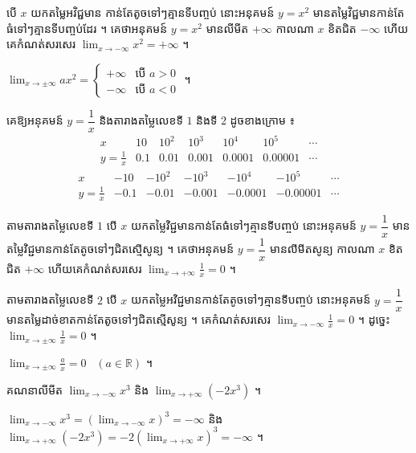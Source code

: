បើ $x$ យកតម្លៃអវិជ្ជមាន កាន់តែតូចទៅៗគ្មានទីបញ្ចប់ នោះអនុគមន៍ $y = x^2$ មានតម្លៃវិជ្ជមានកាន់តែធំទៅៗគ្មានទីបញ្ចប់ដែរ ។ គេថាអនុគមន៍ $y = x^2$ មានលីមីត $+\infty$ កាលណា $x$ ខិតជិត $-\infty$ ហើយគេកំណត់សរសេរ $\displaystyle\lim_{x \to -\infty} x^2 = +\infty$ ។

\begin{formulaBox}[ជាទូទៅ]
$\displaystyle\lim_{x \to \pm\infty} ax^2 = \begin{cases} +\infty & \text{បើ } a > 0\\ -\infty & \text{បើ } a < 0 \end{cases}$ ។
\end{formulaBox}

\begin{example}[ឧទាហរណ៍ ២]
គេឱ្យអនុគមន៍ $y = \dfrac{1}{x}$ និងតារាងតម្លៃលេខទី $1$ និងទី $2$ ដូចខាងក្រោម ៖
\[
\begin{array}{c|cccccc}
x & 10 & 10^2 & 10^3 & 10^4 & 10^5 & \cdots\\ \hline
y = \frac{1}{x} & 0.1 & 0.01 & 0.001 & 0.0001 & 0.00001 & \cdots
\end{array}
\]
\[
\begin{array}{c|cccccc}
x & -10 & -10^2 & -10^3 & -10^4 & -10^5 & \cdots\\ \hline
y = \frac{1}{x} & -0.1 & -0.01 & -0.001 & -0.0001 & -0.00001 & \cdots
\end{array}
\]
\end{example}
តាមតារាងតម្លៃលេខទី $1$ បើ $x$ យកតម្លៃវិជ្ជមានកាន់តែធំទៅៗគ្មានទីបញ្ចប់ នោះអនុគមន៍ $y = \dfrac{1}{x}$ មានតម្លៃវិជ្ជមានកាន់តែតូចទៅៗជិតស្មើសូន្យ ។ គេថាអនុគមន៍ $y = \dfrac{1}{x}$ មានលីមីតសូន្យ កាលណា $x$ ខិតជិត $+\infty$ ហើយគេកំណត់សរសេរ $\displaystyle\lim_{x \to +\infty}\frac{1}{x} = 0$ ។

តាមតារាងតម្លៃលេខទី $2$ បើ $x$ យកតម្លៃអវិជ្ជមានកាន់តែតូចទៅៗគ្មានទីបញ្ចប់ នោះអនុគមន៍ $y = \dfrac{1}{x}$ មានតម្លៃដាច់ខាតកាន់តែតូចទៅៗជិតស្មើសូន្យ ។ គេកំណត់សរសេរ $\displaystyle\lim_{x \to -\infty}\frac{1}{x} = 0$ ។ ដូច្នេះ $\displaystyle\lim_{x \to \pm\infty}\frac{1}{x} = 0$ ។

\begin{formulaBox}[ជាទូទៅ]
$\displaystyle\lim_{x \to \pm\infty}\frac{a}{x} = 0$ \ $(a \in \mathbb{R})$ ។
\end{formulaBox}

\begin{example}[លំហាត់គំរូ ១]
គណនាលីមីត $\displaystyle\lim_{x \to -\infty} x^3$ និង $\displaystyle\lim_{x \to +\infty}(-2x^3)$ ។
\end{example}
\ans
$\displaystyle\lim_{x \to -\infty} x^3 = \left(\lim_{x \to -\infty} x\right)^3 = -\infty$ និង $\displaystyle\lim_{x \to +\infty}(-2x^3) = -2\left(\lim_{x \to +\infty} x\right)^3 = -\infty$ ។

